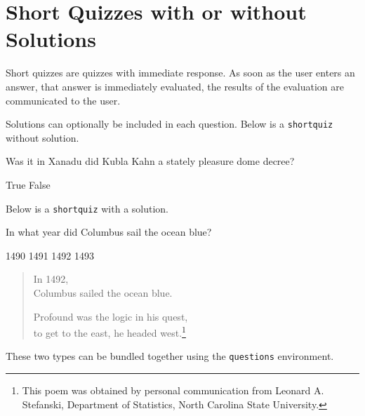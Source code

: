 \documentclass{article}
\begin{document}
\section{Short Quizzes with or without Solutions}


Short quizzes are quizzes with immediate response. As soon as the
user enters an answer, that answer is immediately evaluated, the
results of the evaluation are communicated to the user.

Solutions can optionally be included in each question. Below is a
\texttt{shortquiz} without solution.

\begin{shortquiz}
Was it in Xanadu did Kubla Kahn a stately pleasure dome
decree?
\begin{answers}{4}
\bChoices
     True\eAns
     False\eAns
\eChoices
\end{answers}
\end{shortquiz}

\noindent Below is a \texttt{shortquiz} with a solution.

\goodbreak

\begin{shortquiz*}[KublaKhan]
In what year did Columbus sail the ocean blue?
\begin{answers}[qzcolumbus1]{4}
\bChoices
     1490\eAns
     1491\eAns
     1492\eAns
     1493\eAns
\eChoices
\end{answers}
\begin{solution}
\begin{quote}
  In 1492, \\
  Columbus sailed the ocean blue.\hfill

  Profound was the logic in his quest,\\
  to get to the east, he headed west.\footnote{This poem was obtained by personal
  communication from Leonard A. Stefanski,
Department of Statistics, North Carolina State University.}
\end{quote}
\end{solution}
\end{shortquiz*}

\noindent These two types can be bundled together using the
\texttt{questions} environment.
\end{document}
